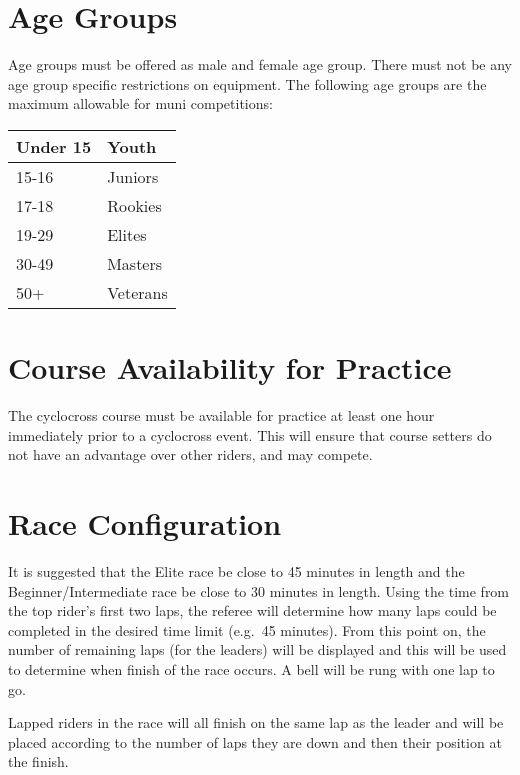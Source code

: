 \section{Age Groups}

Age groups must be offered as male and female age group.
There must not be any age group specific restrictions on equipment.
The following age groups are the maximum allowable for muni competitions:

\begin{tabular}{|l|l|}
\hline
Under 15 & Youth \\
\hline
15-16 & Juniors \\
\hline
17-18 & Rookies \\
\hline
19-29 & Elites \\
\hline
30-49 & Masters \\
\hline
50+ & Veterans \\
\hline
\end{tabular}

\section{Course Availability for Practice}

The cyclocross course must be available for practice at least one hour immediately prior to a cyclocross event.
This will ensure that course setters do not have an advantage over other riders, and may compete.

\section{Race Configuration}

It is suggested that the Elite race be close to 45 minutes in length and the Beginner/Intermediate race be close to 30 minutes in length.
Using the time from the top rider's first two laps, the referee will determine how many laps could be completed in the desired time limit (e.g.\ 45 minutes).
From this point on, the number of remaining laps (for the leaders) will be displayed and this will be used to determine when finish of the race occurs.
A bell will be rung with one lap to go.

Lapped riders in the race will all finish on the same lap as the leader and will be placed according to the number of laps they are down and then their position at the finish.
